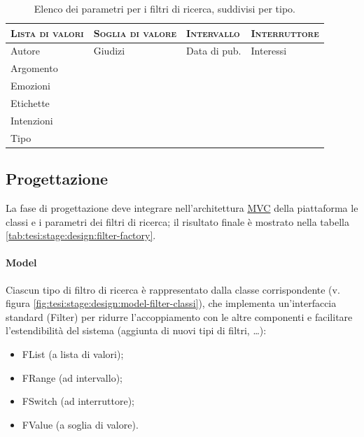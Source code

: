 \begin{table}[ht]
\centering
\begin{tabular}{|l|l|l|l|}
\hline
\textsc{Lista di valori} & \textsc{Soglia di valore} & \textsc{Intervallo} & \textsc{Interruttore}\\ \hline
Autore & Giudizi & Data di pub. & Interessi \\
Argomento & & & \\
Emozioni & & & \\
Etichette & & & \\
Intenzioni & & & \\
Tipo & & & \\ \hline
\end{tabular}
\caption{Elenco dei parametri per i filtri di ricerca, suddivisi per tipo.}
\label{tab:tesi:stage:parametri-filtri-tipo}
\end{table}
	
\subsection{Progettazione}
La fase di progettazione deve integrare nell'architettura \underline{MVC} della piattaforma le classi e i parametri dei filtri di ricerca; il risultato finale è mostrato nella tabella \ref{tab:tesi:stage:design:filter-factory}.

\paragraph{Model}
 Ciascun tipo di filtro di ricerca è rappresentato dalla classe corrispondente (v. figura \ref{fig:tesi:stage:design:model-filter-classi}), che implementa un'interfaccia standard (\textsf{Filter}) per ridurre l'accoppiamento con le altre componenti e facilitare l'estendibilità del sistema (aggiunta di nuovi tipi di filtri, \ldots):
  \begin{itemize}
    \item \textsf{FList} (a lista di valori);
    \item \textsf{FRange} (ad intervallo);
    \item \textsf{FSwitch} (ad interruttore);
    \item \textsf{FValue} (a soglia di valore).
  \end{itemize}
  
